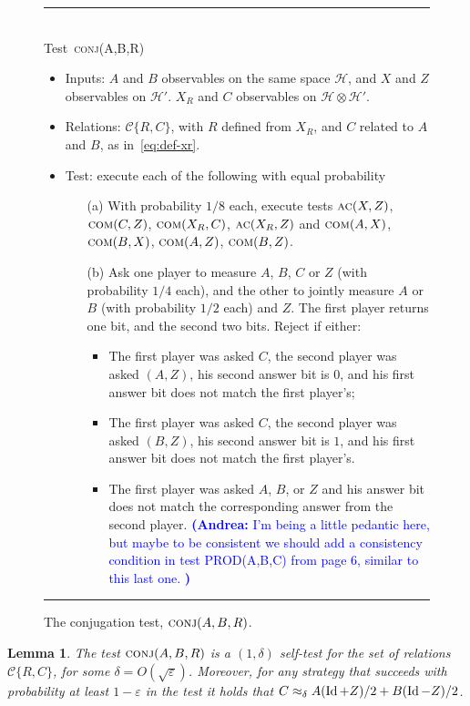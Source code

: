 \documentclass[11pt]{article}
\newtheorem{lemma}[theorem]{Lemma}
\theoremstyle{remark}
\theoremstyle{definition}
\newcommand{\Id}{\ensuremath{\mathop{\rm Id}\nolimits}}
\newcommand{\mH}{\mathcal{H}}
\newcommand{\eps}{\varepsilon}
\newcommand{\conj}{\textsc{conj}}
\newcommand{\comt}{\textsc{com}}
\newcommand{\act}{\textsc{ac}}
\newcommand{\anote}[1]{\textcolor{blue}{\small {\textbf{(Andrea:} #1 \textbf{) }}}}
\begin{document}
\begin{figure}[H]
\rule[1ex]{\textwidth}{0.5pt}\\
Test~\conj(A,B,R) 
\begin{itemize}
    \item Inputs: $A$ and $B$ observables on the same space $\mH$, and $X$ and $Z$ observables on $\mH'$. $X_R$ and $C$ observables on $\mH\otimes \mH'$.
    \item Relations:  $\mathcal{C}\{R,C\} $, with $R$ defined from $X_R$, and $C$ related to $A$ and $B$, as in~\eqref{eq:def-xr}. 
    \item Test: execute each of the following with equal probability
		\begin{enumerate}
\item[(a)] With probability $1/8$ each, execute tests $\act(X,Z)$,  $\comt(C,Z)$, $\comt(X_R,C)$,   $\act(X_R,Z)$ and $\comt(A,X)$, $\comt(B,X)$, $\comt(A,Z)$, $\comt(B,Z)$. 
\item[(b)] Ask one player to measure $A$, $B$, $C$ or $Z$ (with probability $1/4$ each), and the other to jointly measure $A$ or $B$ (with probability $1/2$ each) and $Z$. The first player returns one bit, and the second two bits. Reject if either:
\begin{itemize}
\item The first player was asked $C$, the second player was asked $(A,Z)$, his second answer bit is $0$, and his first answer bit does not match the first player's;
\item The first player was asked $C$, the second player was asked $(B,Z)$, his second answer bit is $1$, and his first answer bit does not match the first player's.
\item The first player was asked $A$, $B$, or $Z$ and his answer bit does not match the corresponding answer from the second player. \anote{I'm being a little pedantic here, but maybe to be consistent we should add a consistency condition in test PROD(A,B,C) from page 6, similar to this last one.}
\end{itemize}
\end{enumerate}
\end{itemize}
\rule[2ex]{\textwidth}{0.5pt}\vspace{-1cm}
\caption{The conjugation test, $\conj(A,B,R)$.}
\label{fig:conjugation-test-1}
\end{figure}

\begin{lemma}\label{lem:conj}
The test $\conj(A,B,R)$ is a $(1,\delta)$ self-test for the set of relations $\mathcal{C}\{R,C\}$, for some $\delta = O(\sqrt{\eps})$. Moreover, for any strategy that succeeds with probability at least $1-\eps$ in the test it holds that $C \approx_{\delta} A (\Id+Z)/2 + B(\Id-Z)/2$. 
\end{lemma}
\end{document}
